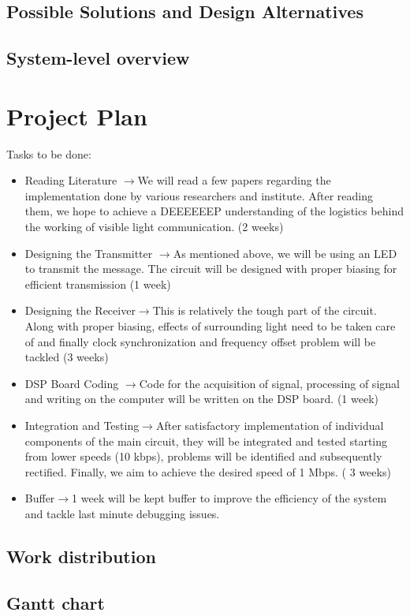 \documentclass{article}
\newcommand{\ra}{$\rightarrow$}
\begin{document}
\subsection{Possible Solutions and Design Alternatives}

\subsection{System-level overview}

\section{Project Plan}
Tasks to be done:
\begin{itemize}
\item Reading Literature \ra We will read a few papers regarding the implementation done by various researchers and institute. After reading them, we hope to achieve a DEEEEEEP understanding of the logistics behind the working of visible light communication. (2 weeks)
\item Designing the Transmitter \ra As mentioned above, we will be using an LED to transmit the message. The circuit will be designed with proper biasing for efficient transmission (1 week)
\item Designing the Receiver\ra This is relatively the tough part of the circuit. Along with proper biasing, effects of surrounding light need to be taken care of and finally clock synchronization  and frequency offset problem will be tackled (3 weeks)
\item DSP Board Coding \ra  Code for the acquisition of signal, processing of signal and writing on the computer will be written on the DSP board. (1 week)
\item Integration and Testing\ra  After satisfactory implementation of individual components of the main circuit, they will be integrated and tested starting from lower speeds (10 kbps), problems will be identified and subsequently rectified. Finally, we aim to achieve the desired  speed of 1 Mbps. ( 3 weeks)
\item Buffer\ra  1 week will be kept buffer to improve the efficiency of the system and tackle last minute debugging issues.
\end{itemize}
\subsection{Work distribution}
\subsection{Gantt chart}
\end{document}
